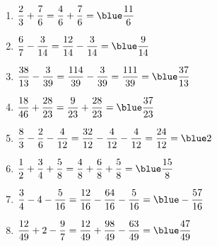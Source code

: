    \ \\ [-5mm]
   \begin{enumerate}
      \item $\dfrac23+\dfrac76 =\dfrac46+\dfrac76 =\blue \dfrac{11}6$ \bigskip
      \item $\dfrac67-\dfrac3{14} =\dfrac{12}{14}-\dfrac3{14} =\blue \dfrac9{14}$ \bigskip
      \item $\dfrac{38}{13}-\dfrac3{39} =\dfrac{114}{39}-\dfrac3{39} =\dfrac{111}{39} =\blue \dfrac{37}{13}$ \bigskip
      \item $\dfrac{18}{46}+\dfrac{28}{23} =\dfrac{9}{23}+\dfrac{28}{23} =\blue \dfrac{37}{23}$ \bigskip
      \item $\dfrac83-\dfrac26-\dfrac4{12} =\dfrac{32}{12}-\dfrac{4}{12}-\dfrac{4}{12} =\dfrac{24}{12} =\blue 2$ \bigskip
      \item $\dfrac12+\dfrac34+\dfrac58 =\dfrac48+\dfrac68+\dfrac58 =\blue \dfrac{15}{8}$ \bigskip
      \item $\dfrac34-4-\dfrac5{16} =\dfrac{12}{16}-\dfrac{64}{16}-\dfrac{5}{16} =\blue -\dfrac{57}{16}$ \bigskip
      \item $\dfrac{12}{49}+2-\dfrac97 =\dfrac{12}{49}+\dfrac{98}{49}-\dfrac{63}{49} =\blue \dfrac{47}{49}$
   \end{enumerate}
